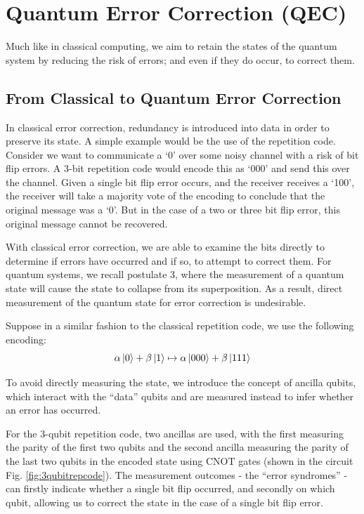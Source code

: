 \section{Quantum Error Correction (QEC)}

Much like in classical computing, we aim to retain the states of the quantum system by reducing the risk of errors; and even if they do occur, to correct them. 

\subsection{From Classical to Quantum Error Correction}

In classical error correction, redundancy is introduced into data in order to preserve its state. A simple example would be the use of the repetition code. Consider we want to communicate a `0' over some noisy channel with a risk of bit flip errors. A 3-bit repetition code would encode this as `000' and send this over the channel. Given a single bit flip error occurs, and the receiver receives a `100', the receiver will take a majority vote of the encoding to conclude that the original message was a `0'. But in the case of a two or three bit flip error, this original message cannot be recovered. 


 With classical error correction, we are able to examine the bits directly to determine if errors have occurred and if so, to attempt to correct them. For quantum systems, we recall postulate 3, where the measurement of a quantum state will cause the state to collapse from its superposition. As a result, direct measurement of the quantum state for error correction is undesirable.

Suppose in a similar fashion to the classical repetition code, we use the following encoding:
\[
\alpha \ket 0  + \beta \ket 1\mapsto \alpha\ket{000}+ \beta \ket{111}
\]

To avoid directly measuring the state, we introduce the concept of ancilla qubits, which interact with the ``data'' qubits and are measured instead to infer whether an error has occurred. 

For the 3-qubit repetition code, two ancillas are used, with the first measuring the parity of the first two qubits and the second ancilla measuring the parity of the last two qubits in the encoded state using CNOT gates (shown in the circuit Fig. \ref{fig:3qubitrepcode}). The measurement outcomes - the ``error syndromes'' - can firstly indicate whether a single bit flip occurred, and secondly on which qubit, allowing us to correct the state in the case of a single bit flip error. 

